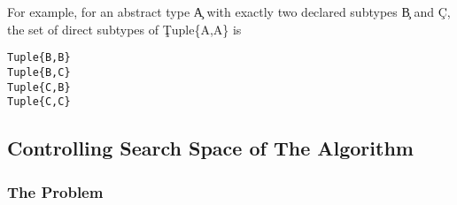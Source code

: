 \begin{description}
\begin{itemize}
          For example, for an abstract type \c{A} with exactly two declared
          subtypes \c{B} and \c{C}, the set of direct subtypes of
          \c{Tuple\{A,A\}} is

\begin{minipage}{.9\textwidth}
        \begin{lstlisting}
Tuple{B,B}
Tuple{B,C}
Tuple{C,B}
Tuple{C,C}
        \end{lstlisting}
\end{minipage}

        \end{itemize}


\end{description}

\subsection{Controlling Search Space of The Algorithm}%
\label{ssec:space}

\subsubsection{The Problem}%

